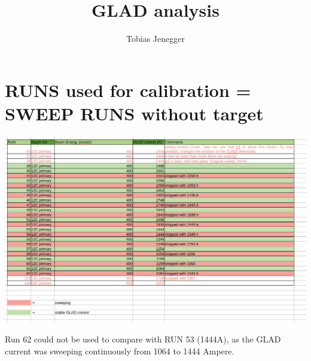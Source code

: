 \documentclass[12pt, letterpaper]{article}
\title{GLAD analysis}
\author{Tobias Jenegger}
\date{}
\begin{document}
\begin{titlepage}
\maketitle
\end{titlepage}
\section{RUNS used for calibration = SWEEP RUNS without target}

\begin{center}
    \includegraphics[width=1.0\textwidth]{runs_screenshot.png}
\end{center}
Run 62 could not be used to compare with RUN 53 (1444A), as the GLAD current was sweeping continuously from 1064 to 1444 Ampere.
\end{document}
